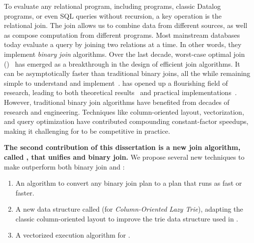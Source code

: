 To evaluate any relational program, 
 including \datalogo programs,
 classic Datalog programs, 
 or even SQL queries without recursion, 
 a key operation is the relational join.
The join allows us to combine data from different sources, 
 as well as compose computation from different programs.
Most mainstream databases today evaluate a query 
 by joining two relations at a time.
In other words, they implement {\em binary join} algorithms.
Over the last decade, worst-case optimal join (\WCOJ)~\cite{
  DBLP:conf/pods/NgoPRR12,
  DBLP:conf/icdt/Veldhuizen14, 
  DBLP:journals/sigmod/NgoRR13, 
  DBLP:conf/pods/000118}
 has emerged as
 a breakthrough in the design of efficient join algorithms.  
It can be
asymptotically faster than traditional binary joins, all the while
remaining simple to understand and
implement~\cite{DBLP:journals/sigmod/NgoRR13}.  
\WCOJ has opened up a flourishing field of research, leading to both theoretical
results~\cite{DBLP:journals/sigmod/NgoRR13,DBLP:conf/pods/Khamis0S17}
and practical
implementations~\cite{DBLP:conf/icdt/Veldhuizen14,DBLP:journals/tods/AbergerLTNOR17,DBLP:journals/pvldb/FreitagBSKN20, DBLP:journals/pvldb/MhedhbiS19}.
However, traditional binary join algorithms have benefited from 
  decades of research and engineering.
Techniques like column-oriented layout, vectorization, 
  and query optimization
  have contributed compounding constant-factor speedups,
  making it challenging for \WCOJ to be competitive in practice.

\textbf{
The second contribution of this dissertation is a new join algorithm,
  called \FJ, that unifies \WCOJ and binary join.}
We propose several new techniques to make \FJ outperform
both binary join and \WCOJ:
\begin{enumerate}
\item An algorithm to convert any binary join plan to a \FJ
  plan that runs as fast or faster.
\item A new data structure called
\COLT (for \emph{Column-Oriented Lazy Trie}), adapting the classic
column-oriented layout to improve the trie data structure used in
\WCOJ.
\item A vectorized execution algorithm for \FJ.
\end{enumerate}

